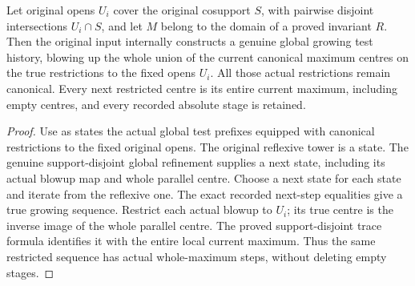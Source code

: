 \begin{theorem}
\label{hir:support-disjoint-canonical-growing-history}
\leanok
Let original opens $U_i$ cover the original cosupport $S$,
with pairwise disjoint intersections $U_i\cap S$, and let
$M$ belong to the domain of a proved invariant $R$.
Then the original input internally constructs a genuine
global growing test history, blowing up the whole union
of the current canonical maximum centres on the true
restrictions to the fixed opens $U_i$. All those actual
restrictions remain canonical. Every next restricted
centre is its entire current maximum, including empty
centres, and every recorded absolute stage is retained.
\end{theorem}
\begin{proof}
Use as states the actual global test prefixes equipped
with canonical restrictions to the fixed original opens.
The original reflexive tower is a state. The genuine
support-disjoint global refinement supplies a next state,
including its actual blowup map and whole parallel centre.
Choose a next state for each state and iterate from the
reflexive one. The exact recorded next-step equalities
give a true growing sequence. Restrict each actual blowup
to $U_i$; its true centre is the inverse image of the whole
parallel centre. The proved support-disjoint trace formula
identifies it with the entire local current maximum.
Thus the same restricted sequence has actual whole-maximum
steps, without deleting empty stages.
\end{proof}

